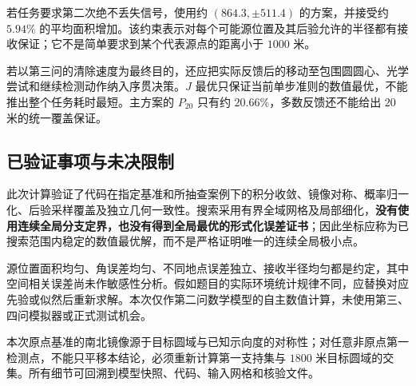 \documentclass[UTF8,a4paper,zihao=5,fontset=none]{ctexart}
\begin{document}
若任务要求第二次绝不丢失信号，使用约 \((864.3,\pm511.4)\) 的方案，并接受约 \(5.94\%\) 的平均面积增加。该约束表示对每个可能源位置及其后验允许的半径都有接收保证；它不是简单要求到某个代表源点的距离小于 \(1000\) 米。

若以第三问的清除速度为最终目的，还应把实际反馈后的移动至包围圆圆心、光学尝试和继续检测动作纳入序贯决策。\(J\) 最优只保证当前单步准则的数值最优，不能推出整个任务耗时最短。主方案的 \(P_{20}\) 只有约 \(20.66\%\)，多数反馈还不能给出 \(20\) 米的统一覆盖保证。

\subsection{已验证事项与未决限制}
此次计算验证了代码在指定基准和所抽查案例下的积分收敛、镜像对称、概率归一化、后验采样覆盖及独立几何一致性。搜索采用有界全域网格及局部细化，\textbf{没有使用连续全局分支定界，也没有得到全局最优的形式化误差证书}；因此坐标应称为已搜索范围内稳定的数值最优解，而不是严格证明唯一的连续全局极小点。

源位置面积均匀、角误差均匀、不同地点误差独立、接收半径均匀都是约定，其中空间相关误差尚未作敏感性分析。假如题目的实际环境统计规律不同，应替换对应先验或似然后重新求解。本次仅作第二问数学模型的自主数值计算，未使用第三、四问模拟器或正式测试机会。

本次原点基准的南北镜像源于目标圆域与已知示向度的对称性；对任意非原点第一检测点，不能只平移本结论，必须重新计算第一支持集与 \(1800\) 米目标圆域的交集。所有细节可回溯到模型快照、代码、输入网格和核验文件。
\end{document}
